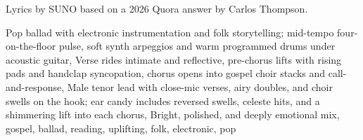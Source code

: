
\begin{notes}
Lyrics by SUNO based on a 2026 Quora answer by Carlos Thompson.
\end{notes}
\begin{style}
Pop ballad with electronic instrumentation and folk storytelling; mid-tempo four-on-the-floor pulse, soft synth arpeggios and warm programmed drums under acoustic guitar, Verse rides intimate and reflective, pre-chorus lifts with rising pads and handclap syncopation, chorus opens into gospel choir stacks and call-and-response, Male tenor lead with close-mic verses, airy doubles, and choir swells on the hook; ear candy includes reversed swells, celeste hits, and a shimmering lift into each chorus, Bright, polished, and deeply emotional mix, gospel, ballad, reading, uplifting, folk, electronic, pop
\end{style}
